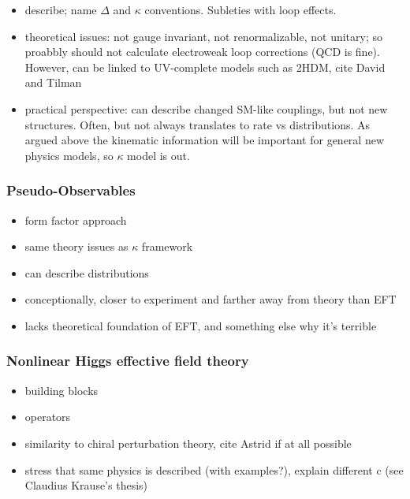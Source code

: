 \begin{itemize}
\item describe; name $\Delta$ and $\kappa$ conventions. Subleties with
  loop effects.
%
\item theoretical issues: not gauge invariant, not renormalizable, not
  unitary; so proabbly should not calculate electroweak loop
  corrections (QCD is fine). However, can be linked to UV-complete
  models such as 2HDM, cite David and Tilman
%
\item practical perspective: can describe changed SM-like couplings,
  but not new structures. Often, but not always translates to rate vs
  distributions. As argued above the kinematic information will be
  important for general new physics models, so $\kappa$ model is out.
\end{itemize}

\subsubsection*{Pseudo-Observables}



\begin{itemize}
\item form factor approach
%
\item same theory issues as $\kappa$ framework
%
\item can describe distributions
%
\item conceptionally, closer to experiment and farther away from theory than EFT
%
\item lacks theoretical foundation of EFT, and something else why it's terrible
\end{itemize}

\subsubsection*{Nonlinear Higgs effective field theory}



\begin{itemize}
\item building blocks
%
\item operators
%
\item similarity to chiral perturbation theory, cite Astrid if at all possible
%
\item stress that same physics is described (with examples?), explain different c (see Claudius Krause's thesis)
\end{itemize}









